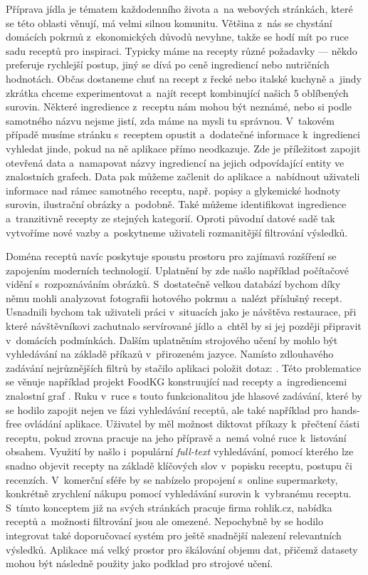 Příprava jídla je tématem každodenního života a~na webových stránkách, které se této oblasti věnují, má velmi silnou komunitu. Většina z~nás se chystání domácích pokrmů z~ekonomických důvodů nevyhne, takže se hodí mít po ruce sadu receptů pro inspiraci. Typicky máme na recepty různé požadavky --- někdo preferuje rychlejší postup, jiný se dívá po ceně ingrediencí nebo nutričních hodnotách. Občas dostaneme chuť na recept z řecké nebo italské kuchyně a~jindy zkrátka chceme experimentovat a~najít recept kombinující našich $5$ oblíbených surovin. Některé ingredience z~receptu nám mohou být neznámé, nebo si podle samotného názvu nejsme jistí, zda máme na mysli tu správnou. V~takovém případě musíme stránku s~receptem opustit a~dodatečné informace k~ingredienci vyhledat jinde, pokud na ně aplikace přímo neodkazuje. Zde je příležitost zapojit otevřená data a~namapovat názvy ingrediencí na jejich odpovídající entity ve znalostních grafech. Data pak můžeme začlenit do aplikace a~nabídnout uživateli informace nad rámec samotného receptu, např. popisy a glykemické hodnoty surovin, ilustrační obrázky a~podobně. Také můžeme identifikovat ingredience a~tranzitivně recepty ze stejných kategorií. Oproti původní datové sadě tak vytvoříme nové vazby a~poskytneme uživateli rozmanitější filtrování výsledků.

Doména receptů navíc poskytuje spoustu prostoru pro zajímavá rozšíření se zapojením moderních technologií. Uplatnění by zde našlo například počítačové vidění s~rozpoznáváním obrázků. S~dostatečně velkou databází bychom díky němu mohli analyzovat fotografii hotového pokrmu a~nalézt příslušný recept. Usnadnili bychom tak uživateli práci v~situacích jako je návštěva restaurace, při které návštěvníkovi zachutnalo servírované jídlo a~chtěl by si jej později připravit v~domácích podmínkách. Dalším uplatněním strojového učení by mohlo být vyhledávání na základě příkazů v~přirozeném jazyce. Namísto zdlouhavého zadávání nejrůznějších filtrů by stačilo aplikaci položit dotaz: . Této problematice se věnuje například projekt FoodKG konstruující nad recepty a~ingrediencemi znalostní graf \citep{food-kg}. Ruku v~ruce s touto funkcionalitou jde hlasové zadávání, které by se hodilo zapojit nejen ve fázi vyhledávání receptů, ale také například pro hands-free ovládání aplikace. Uživatel by měl možnost diktovat příkazy k~přečtení části receptu, pokud zrovna pracuje na jeho přípravě a~nemá volné ruce k~listování obsahem. Využití by našlo i~populární \emph{full-text} vyhledávání, pomocí kterého lze snadno objevit recepty na základě klíčových slov v~popisku receptu, postupu či recenzích. V~komerční sféře by se nabízelo propojení s~online supermarkety, konkrétně zrychlení nákupu pomocí vyhledávání surovin k~vybranému receptu. S~tímto konceptem již na svých stránkách pracuje firma rohlik.cz, nabídka receptů a~možnosti filtrování jsou ale omezené. Nepochybně by se hodilo integrovat také doporučovací systém pro ještě snadnější nalezení relevantních výsledků. Aplikace má velký prostor pro škálování objemu dat, přičemž datasety mohou být následně použity jako podklad pro strojové učení.